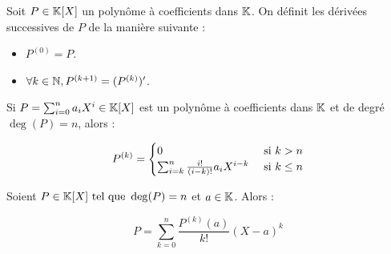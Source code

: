\documentclass[12pt, a4paper]{report}
\begin{document}
\begin{definition}
    Soit $P \in \mathbb{K}[X]$ un polynôme à coefficients dans $\mathbb{K}$. On définit les dérivées successives de $P$ de la manière suivante :
    \begin{itemize}
        \item $P^{(0)} = P$.
        \item $\forall k \in \mathbb{N}, P^{(k+1)} = (P^{(k)})'$.
    \end{itemize}
\end{definition}

\begin{remark}
    Si $P = \sum_{i=0}^{n}a_i X^i \in \mathbb{K}[X]$ est un polynôme à coefficients dans $\mathbb{K}$ et de degré $\deg(P) = n$, alors :

    $$P^{(k)} = \begin{cases}
        0 & \text{ si } k > n\\
        \sum_{i=k}^{n} \frac{i!}{(i-k)!} a_i X^{i-k} & \text{ si } k \le n
    \end{cases}$$
\end{remark}

\begin{theorem}
    Soient $P \in \mathbb{K}[X] \text{ tel que } \deg(P) = n$ et $a \in \mathbb{K}$. Alors :

    $$P = \sum_{k=0}^{n} \frac{P^{(k)}(a)}{k!} (X-a)^k$$
\end{theorem}
\end{document}
